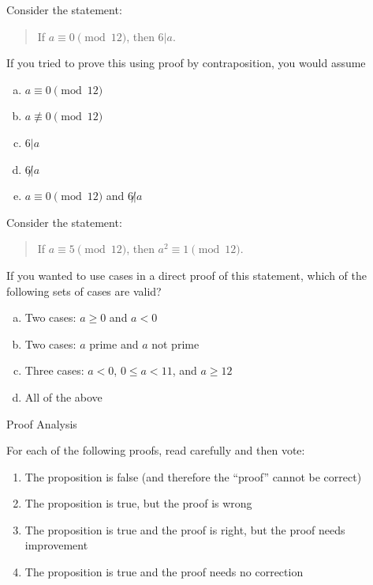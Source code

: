 \documentclass[palatino]{beamer}
\begin{document}
\begin{frame}
	Consider the statement:
	\begin{quote}
		If $a \equiv 0 \pmod {12}$, then $6 | a$. 
	\end{quote}
If you tried to prove this using proof by contraposition, you would assume
	\begin{enumerate}[(a)]
		\item $a \equiv 0 \pmod {12}$
		\item $a \not \equiv 0 \pmod {12}$
		\item $6 | a$
		\item $6 \not | a$
		\item $a \equiv 0 \pmod {12}$ and $6 \not | a$
	\end{enumerate}
\end{frame}

\begin{frame}
	Consider the statement:
	\begin{quote}
		If $a \equiv 5 \pmod {12}$, then $a^2 \equiv 1 \pmod {12}$. 
	\end{quote}
If you wanted to use cases in a direct proof of this statement, which of the following sets of cases are valid? 
	\begin{enumerate}[(a)]
		\item Two cases: $a \geq 0$ and $a < 0$
		\item Two cases: $a$ prime and $a$ not prime
		\item Three cases: $a < 0$, $0 \leq a < 11$, and $a \geq 12$
		\item All of the above
	\end{enumerate}
\end{frame}

\begin{frame}{Proof Analysis}
	
For each of the following proofs, read carefully and then vote: 
\begin{enumerate}
	\item The proposition is false (and therefore the ``proof'' cannot be correct)
	\item The proposition is true, but the proof is wrong 
	\item The proposition is true and the proof is right, but the proof needs improvement
	\item The proposition is true and the proof needs no correction
\end{enumerate}
	
\end{frame}
\end{document}
